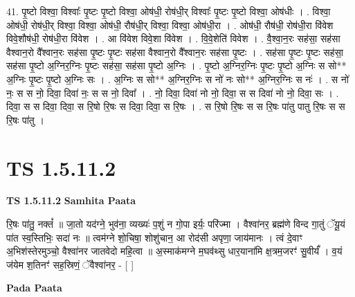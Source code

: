 \documentclass[17pt]{extarticle}
\begin{document}
41. पृ॒ष्टो विश्वा॒ विश्वाः᳚ पृ॒ष्टः पृ॒ष्टो विश्वा॒ ओष॑धी॒ रोष॑धी॒र् विश्वाः᳚ पृ॒ष्टः पृ॒ष्टो विश्वा॒ ओष॑धीः । . विश्वा॒ ओष॑धी॒ रोष॑धी॒र् विश्वा॒ विश्वा॒ ओष॑धी॒ रौष॑धी॒र् विश्वा॒ विश्वा॒ ओष॑धी॒रा । . ओष॑धी॒ रौष॑धी॒ रोष॑धी॒रा वि॑वेश विवे॒शौष॑धी॒ रोष॑धी॒रा वि॑वेश । . आ वि॑वेश विवे॒शा वि॑वेश । . वि॒वे॒शेति॑ विवेश । . वै॒श्वा॒न॒रः सह॑सा॒ सह॑सा वैश्वान॒रो वै᳚श्वान॒रः सह॑सा पृ॒ष्टः पृ॒ष्टः सह॑सा वैश्वान॒रो वै᳚श्वान॒रः सह॑सा पृ॒ष्टः । . सह॑सा पृ॒ष्टः पृ॒ष्टः सह॑सा॒ सह॑सा पृ॒ष्टो अ॒ग्निर॒ग्निः पृ॒ष्टः सह॑सा॒ सह॑सा पृ॒ष्टो अ॒ग्निः । . पृ॒ष्टो अ॒ग्निर॒ग्निः पृ॒ष्टः पृ॒ष्टो अ॒ग्निः स सो** अ॒ग्निः पृ॒ष्टः पृ॒ष्टो अ॒ग्निः सः । . अ॒ग्निः स सो** अ॒ग्निर॒ग्निः स नो॑ नः सो** अ॒ग्निर॒ग्निः स नः॑ । . स नो॑ नः॒ स स नो॒ दिवा॒ दिवा॑ नः॒ स स नो॒ दिवा᳚ । . नो॒ दिवा॒ दिवा॑ नो नो॒ दिवा॒ स स दिवा॑ नो नो॒ दिवा॒ सः । . दिवा॒ स स दिवा॒ दिवा॒ स रि॒षो रि॒षः स दिवा॒ दिवा॒ स रि॒षः । . स रि॒षो रि॒षः स स रि॒षः पा॑तु पातु रि॒षः स स रि॒षः पा॑तु । \newline
\pagebreak
{}
\section*{ TS 1.5.11.2 }

\textbf{TS 1.5.11.2 } \newline
\textbf{Samhita Paata} \newline

रि॒षः पा॑तु॒ नक्तं᳚ ॥ जा॒तो यद॑ग्ने॒ भुव॑ना॒ व्यख्यः॑ प॒शुं न गो॒पा इर्यः॒ परि॑ज्मा । वैश्वा॑नर॒ ब्रह्म॑णे विन्द गा॒तुं ॅयू॒यं पा॑त स्व॒स्तिभिः॒ सदा॑ नः ॥ त्वम॑ग्ने शो॒चिषा॒ शोशु॑चान॒ आ रोद॑सी अपृणा॒ जाय॑मानः । त्वं दे॒वाꣳ अ॒भिश॑स्तेरमुञ्चो॒ वैश्वा॑नर जातवेदो महि॒त्वा ॥ अ॒स्माक॑मग्ने म॒घव॑थ्सु धार॒याना॑मि क्ष॒त्रम॒जरꣳ॑ सु॒वीर्यं᳚ । व॒यं ज॑येम श॒तिनꣳ॑ सह॒स्रिणं॒ ॅवैश्वा॑नर॒ - [ ] \newline

\textbf{Pada Paata} \newline
\end{document}

